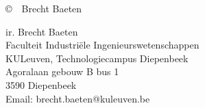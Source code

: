 \null
\vfill
\copyright\ \the\year\ Brecht Baeten
\vspace{6cm}

ir. Brecht Baeten\\
Faculteit Industriële Ingenieurswetenschappen\\
KULeuven, Technologiecampus Diepenbeek\\
Agoralaan gebouw B bus 1\\
3590 Diepenbeek\\
Email: brecht.baeten@kuleuven.be\\